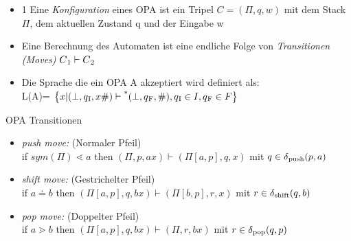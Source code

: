 \documentclass[
10pt,
pantone315, 	%
]{beamer}
\begin{document}
\begin{frame}[t]{\subsecname}
	\begin{itemize}
		\item
1		Eine \textit{Konfiguration} eines OPA ist ein Tripel $C = (\Pi, q, w)$ mit dem Stack $\Pi$, dem aktuellen Zustand q und der Eingabe w
		\item Eine Berechnung des Automaten ist eine endliche Folge von \textit{Transitionen (Moves)} $C \textsubscript{1} \vdash C \textsubscript{2}$
		\item
		Die Sprache die ein OPA A akzeptiert wird definiert als: \\
		L(A)= $\left\{x|(\perp, q \textsubscript{I}, x\#) \vdash \textsuperscript{*} ( \perp, q \textsubscript{F}, \#) ,
		q \textsubscript{I} \in I, q \textsubscript{F} \in F \right\}$
	\end{itemize}
\end{frame}

\begin{frame}[t]{OPA Transitionen}
	\begin{itemize}
		\item
		\textit{push move:} (Normaler Pfeil) \\
		if $sym(\Pi) \lessdot a$ then $(\Pi, p, ax) \vdash (\Pi\left[a, p \right], q, x)$ mit 
		$q \in \delta \textsubscript{push} (p,a)$
		\item
		\textit{shift move: } (Gestrichelter Pfeil) \\
		if $a \doteq b$ then $(\Pi\left[a, p \right], q, bx) \vdash (\Pi \left[ b, p \right], r, x)$ mit 
		$r \in \delta \textsubscript{shift} (q, b)$
		\item
		\textit{pop move: } (Doppelter Pfeil) \\
		if $ a \gtrdot b$ then $(\Pi\left[a, p\right], q, bx) \vdash (\Pi, r, bx)$ mit $r \in \delta \textsubscript{pop} (q,p)$
	
	\end{itemize}
\end{frame}
\end{document}
